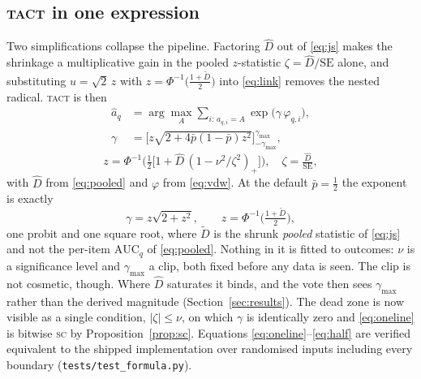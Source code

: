 \documentclass[twoside,11pt]{article}
\newcommand{\Dhat}{\widehat{D}}
\newcommand{\SC}{\textsc{sc}}
\newcommand{\TACT}{\textsc{tact}}
\begin{document}
\subsection{\TACT{} in one expression}\label{sec:oneline}
Two simplifications collapse the pipeline. Factoring $\Dhat$ out of
\eqref{eq:js} makes the shrinkage a multiplicative gain in the pooled
$z$-statistic $\zeta=\Dhat/\mathrm{SE}$ alone, and substituting
$u=\sqrt2\,z$ with $z=\Phi^{-1}\!\big(\tfrac{1+\tilde D}{2}\big)$ into
\eqref{eq:link} removes the nested radical. \TACT{} is then
\begin{equation}\label{eq:oneline}
\boxed{\;
\begin{aligned}
\hat a_q&=\arg\max_A \sum_{i:\,a_{q,i}=A}\exp\big(\gamma\,\varphi_{q,i}\big),\\[2pt]
\gamma&=\Big[z\sqrt{2+4\bar p(1-\bar p)z^{2}}\Big]_{-\gamma_{\max}}^{\gamma_{\max}},
\end{aligned}
\;}
\end{equation}
\begin{equation}\label{eq:oneline2}
z=\Phi^{-1}\!\Big(\tfrac12\big[1+\Dhat\,(1-\nu^{2}/\zeta^{2})_{+}\big]\Big),
\quad \zeta=\tfrac{\Dhat}{\mathrm{SE}},
\end{equation}
with $\Dhat$ from \eqref{eq:pooled} and $\varphi$ from \eqref{eq:vdw}. At the
default $\bar p=\tfrac12$ the exponent is exactly
\begin{equation}\label{eq:half}
\gamma=z\sqrt{2+z^{2}},\qquad z=\Phi^{-1}\!\big(\tfrac{1+\tilde D}{2}\big),
\end{equation}
one probit and one square root, where $\tilde D$ is the shrunk \emph{pooled}
statistic of \eqref{eq:js} and not the per-item $\mathrm{AUC}_q$ of
\eqref{eq:pooled}. Nothing in it is fitted to outcomes: $\nu$ is a
significance level and $\gamma_{\max}$ a clip, both fixed before any data is
seen. The clip is not cosmetic, though. Where $\Dhat$ saturates it binds, and
the vote then sees $\gamma_{\max}$ rather than the derived magnitude
(Section~\ref{sec:results}). The dead zone is now visible as a single condition,
$|\zeta|\le\nu$, on which $\gamma$ is identically zero and \eqref{eq:oneline}
is bitwise \SC{} by Proposition~\ref{prop:sc}. Equations
\eqref{eq:oneline}--\eqref{eq:half} are verified equivalent to the shipped
implementation over randomised inputs including every boundary
(\texttt{tests/test\_formula.py}).
\end{document}
